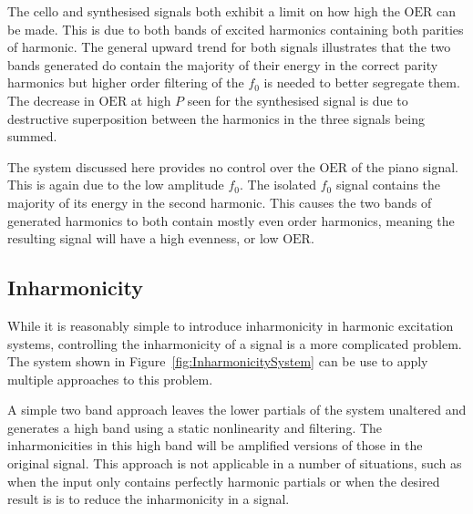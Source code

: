 		The cello and synthesised signals both exhibit a limit on how high the $\mathrm{OER}$ can be made. This is
		due to both bands of excited harmonics containing both parities of harmonic.  The general upward trend for
		both signals illustrates that the two bands generated do contain the majority of their energy in the
		correct parity harmonics but higher order filtering of the $f_{0}$ is needed to better segregate them. The
		decrease in $\mathrm{OER}$ at high $P$ seen for the synthesised signal is due to destructive superposition
		between the harmonics in the three signals being summed.

		The system discussed here provides no control over the $\mathrm{OER}$ of the piano signal. This is again
		due to the low amplitude $f_{0}$. The isolated $f_{0}$ signal contains the majority of its energy in the
		second harmonic. This causes the two bands of generated harmonics to both contain mostly even order
		harmonics, meaning the resulting signal will have a high evenness, or low $\mathrm{OER}$.

	\subsection{Inharmonicity}
	\label{sec:FeatureControl-Parameterisation-Inharmonicity}
		While it is reasonably simple to introduce inharmonicity in harmonic excitation systems, controlling the
		inharmonicity of a signal is a more complicated problem. The system shown in
		Figure~\ref{fig:InharmonicitySystem} can be use to apply multiple approaches to this problem. 

		A simple two band approach leaves the lower partials of the system unaltered and generates a high band
		using a static nonlinearity and filtering. The inharmonicities in this high band will be amplified versions
		of those in the original signal. This approach is not applicable in a number of situations, such as when
		the input only contains perfectly harmonic partials or when the desired result is is to reduce the
		inharmonicity in a signal.
		
